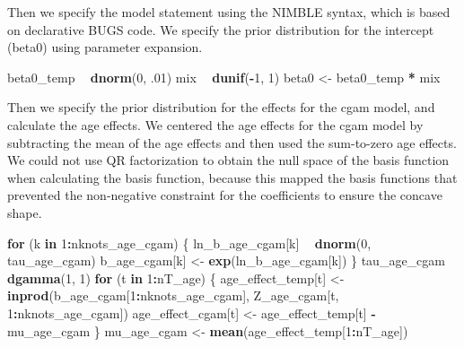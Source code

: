 \documentclass[11pt,]{article}
\newenvironment{Shaded}{\begin{snugshade}}{\end{snugshade}}
\newcommand{\KeywordTok}[1]{\textcolor[rgb]{0.13,0.29,0.53}{\textbf{#1}}}
\newcommand{\DecValTok}[1]{\textcolor[rgb]{0.00,0.00,0.81}{#1}}
\newcommand{\StringTok}[1]{\textcolor[rgb]{0.31,0.60,0.02}{#1}}
\newcommand{\ControlFlowTok}[1]{\textcolor[rgb]{0.13,0.29,0.53}{\textbf{#1}}}
\newcommand{\OperatorTok}[1]{\textcolor[rgb]{0.81,0.36,0.00}{\textbf{#1}}}
\newcommand{\NormalTok}[1]{#1}
\begin{document}
Then we specify the model statement using the NIMBLE syntax, which is
based on declarative BUGS code. We specify the prior distribution for
the intercept (beta0) using parameter expansion.

\begin{Shaded}
\begin{Highlighting}[]
\NormalTok{  beta0_temp }\OperatorTok{~}\StringTok{ }\KeywordTok{dnorm}\NormalTok{(}\DecValTok{0}\NormalTok{, .}\DecValTok{01}\NormalTok{)}
\NormalTok{  mix }\OperatorTok{~}\StringTok{ }\KeywordTok{dunif}\NormalTok{(}\OperatorTok{-}\DecValTok{1}\NormalTok{, }\DecValTok{1}\NormalTok{)}
\NormalTok{  beta0 <-}\StringTok{ }\NormalTok{beta0_temp }\OperatorTok{*}\StringTok{ }\NormalTok{mix}
\end{Highlighting}
\end{Shaded}

Then we specify the prior distribution for the effects for the cgam
model, and calculate the age effects. We centered the age effects for
the cgam model by subtracting the mean of the age effects and then used
the sum-to-zero age effects. We could not use QR factorization to obtain
the null space of the basis function when calculating the basis
function, because this mapped the basis functions that prevented the
non-negative constraint for the coefficients to ensure the concave
shape.

\begin{Shaded}
\begin{Highlighting}[]
  \ControlFlowTok{for}\NormalTok{ (k }\ControlFlowTok{in} \DecValTok{1}\OperatorTok{:}\NormalTok{nknots_age_cgam) \{}
\NormalTok{    ln_b_age_cgam[k] }\OperatorTok{~}\StringTok{ }\KeywordTok{dnorm}\NormalTok{(}\DecValTok{0}\NormalTok{, tau_age_cgam)}
\NormalTok{    b_age_cgam[k] <-}\StringTok{ }\KeywordTok{exp}\NormalTok{(ln_b_age_cgam[k])}
\NormalTok{  \}}
\NormalTok{  tau_age_cgam }\OperatorTok{~}\StringTok{ }\KeywordTok{dgamma}\NormalTok{(}\DecValTok{1}\NormalTok{, }\DecValTok{1}\NormalTok{)}
  \ControlFlowTok{for}\NormalTok{ (t }\ControlFlowTok{in} \DecValTok{1}\OperatorTok{:}\NormalTok{nT_age) \{}
\NormalTok{    age_effect_temp[t] <-}\StringTok{ }\KeywordTok{inprod}\NormalTok{(b_age_cgam[}\DecValTok{1}\OperatorTok{:}\NormalTok{nknots_age_cgam],}
\NormalTok{                                 Z_age_cgam[t, }\DecValTok{1}\OperatorTok{:}\NormalTok{nknots_age_cgam])}
\NormalTok{    age_effect_cgam[t] <-}\StringTok{ }\NormalTok{age_effect_temp[t] }\OperatorTok{-}\StringTok{ }\NormalTok{mu_age_cgam}
\NormalTok{  \}}
\NormalTok{  mu_age_cgam <-}\StringTok{ }\KeywordTok{mean}\NormalTok{(age_effect_temp[}\DecValTok{1}\OperatorTok{:}\NormalTok{nT_age])}
\end{Highlighting}
\end{Shaded}
\end{document}

